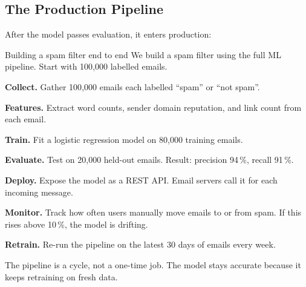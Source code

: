 \documentclass[a4paper,11pt]{article}
\begin{document}
\subsection{The Production Pipeline}

After the model passes evaluation, it enters production:

\begin{center}
\end{center}

\begin{worked}{Building a spam filter end to end}
We build a spam filter using the full ML pipeline. Start with 100{,}000 labelled emails.
\begin{steps}
  \item \textbf{Collect.} Gather 100{,}000 emails each labelled ``spam'' or ``not spam''.
  \item \textbf{Features.} Extract word counts, sender domain reputation, and link count from each email.
  \item \textbf{Train.} Fit a logistic regression model on 80{,}000 training emails.
  \item \textbf{Evaluate.} Test on 20{,}000 held-out emails. Result: precision 94\,\%, recall 91\,\%.
  \item \textbf{Deploy.} Expose the model as a REST API. Email servers call it for each incoming message.
  \item \textbf{Monitor.} Track how often users manually move emails to or from spam. If this rises above 10\,\%, the model is drifting.
  \item \textbf{Retrain.} Re-run the pipeline on the latest 30 days of emails every week.
\end{steps}
The pipeline is a cycle, not a one-time job. The model stays accurate because it keeps retraining on fresh data.
\end{worked}

\end{document}
